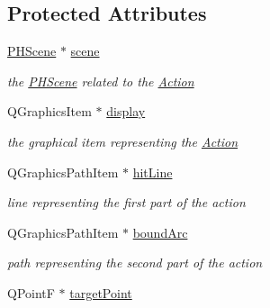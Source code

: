 \subsection*{Protected Attributes}
\begin{DoxyCompactItemize}
\item 
\hypertarget{classGAction_a5318deb6935859f5d2ebd1836ec6eb85}{\hyperlink{classPHScene}{P\+H\+Scene} $\ast$ \hyperlink{classGAction_a5318deb6935859f5d2ebd1836ec6eb85}{scene}}\label{classGAction_a5318deb6935859f5d2ebd1836ec6eb85}

\begin{DoxyCompactList}\small\item\em the \hyperlink{classPHScene}{P\+H\+Scene} related to the \hyperlink{classAction}{Action} \end{DoxyCompactList}\item 
\hypertarget{classGAction_a80fd22faf283374dd9861bf4900eafa4}{Q\+Graphics\+Item $\ast$ \hyperlink{classGAction_a80fd22faf283374dd9861bf4900eafa4}{display}}\label{classGAction_a80fd22faf283374dd9861bf4900eafa4}

\begin{DoxyCompactList}\small\item\em the graphical item representing the \hyperlink{classAction}{Action} \end{DoxyCompactList}\item 
\hypertarget{classGAction_a7d9568fcba3679f9ff9edc71beee92f5}{Q\+Graphics\+Path\+Item $\ast$ \hyperlink{classGAction_a7d9568fcba3679f9ff9edc71beee92f5}{hit\+Line}}\label{classGAction_a7d9568fcba3679f9ff9edc71beee92f5}

\begin{DoxyCompactList}\small\item\em line representing the first part of the action \end{DoxyCompactList}\item 
\hypertarget{classGAction_a2ff47768398033e52bd3b78586b1d29c}{Q\+Graphics\+Path\+Item $\ast$ \hyperlink{classGAction_a2ff47768398033e52bd3b78586b1d29c}{bound\+Arc}}\label{classGAction_a2ff47768398033e52bd3b78586b1d29c}

\begin{DoxyCompactList}\small\item\em path representing the second part of the action \end{DoxyCompactList}\item 
\hypertarget{classGAction_ad6992ac8b540932c370f5b46c48bbe70}{Q\+Point\+F $\ast$ \hyperlink{classGAction_ad6992ac8b540932c370f5b46c48bbe70}{target\+Point}}\label{classGAction_ad6992ac8b540932c370f5b46c48bbe70}


\end{DoxyCompactItemize}
